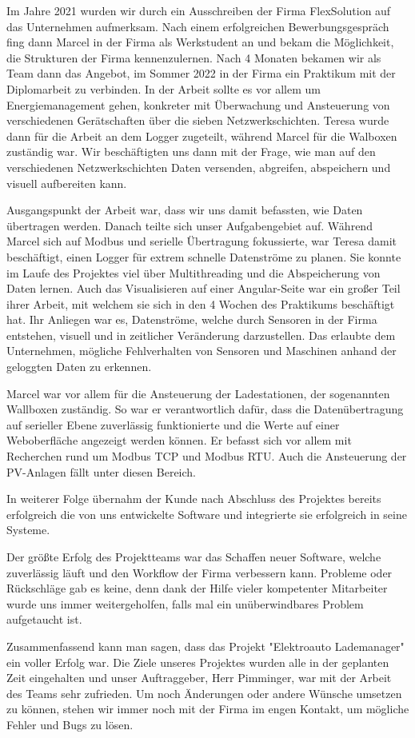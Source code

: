 
Im Jahre 2021 wurden wir durch ein Ausschreiben der Firma FlexSolution auf das Unternehmen aufmerksam. Nach einem erfolgreichen Bewerbungsgespräch fing dann Marcel in der Firma als Werkstudent an und bekam die Möglichkeit, die Strukturen der Firma kennenzulernen. Nach 4 Monaten bekamen wir als Team dann das Angebot, im Sommer 2022 in der Firma ein Praktikum mit der Diplomarbeit zu verbinden. In der Arbeit sollte es vor allem um Energiemanagement gehen, konkreter mit Überwachung und Ansteuerung von verschiedenen Gerätschaften über die sieben Netzwerkschichten. Teresa wurde dann für die Arbeit an dem Logger zugeteilt, während Marcel für die Walboxen zuständig war. Wir beschäftigten uns dann mit der Frage, wie man auf den verschiedenen Netzwerkschichten Daten versenden, abgreifen, abspeichern und visuell aufbereiten kann.



Ausgangspunkt der Arbeit war, dass wir uns damit befassten, wie Daten übertragen werden. Danach teilte sich unser Aufgabengebiet auf. Während Marcel sich auf Modbus und serielle Übertragung fokussierte, war Teresa damit beschäftigt, einen Logger für extrem schnelle Datenströme zu planen. Sie konnte im Laufe des Projektes viel über Multithreading und die Abspeicherung von Daten lernen. Auch das Visualisieren auf einer Angular-Seite war ein großer Teil ihrer Arbeit, mit welchem sie sich in den 4 Wochen des Praktikums beschäftigt hat. Ihr Anliegen war es, Datenströme, welche durch Sensoren in der Firma entstehen, visuell und in zeitlicher Veränderung darzustellen. Das erlaubte dem Unternehmen, mögliche Fehlverhalten von Sensoren und Maschinen anhand der geloggten Daten zu erkennen.



Marcel war vor allem für die Ansteuerung der Ladestationen, der sogenannten Wallboxen zuständig. So war er verantwortlich dafür, dass die Datenübertragung auf serieller Ebene zuverlässig funktionierte und die Werte auf einer Weboberfläche angezeigt werden können. Er befasst sich vor allem mit Recherchen rund um Modbus TCP und Modbus RTU. Auch die Ansteuerung der PV-Anlagen fällt unter diesen Bereich.


In weiterer Folge übernahm der Kunde nach Abschluss des Projektes bereits erfolgreich die von uns entwickelte Software und integrierte sie erfolgreich in seine Systeme.


Der größte Erfolg des Projektteams war das Schaffen neuer Software, welche zuverlässig läuft und den Workflow der Firma verbessern kann. Probleme oder Rückschläge gab es keine, denn dank der Hilfe vieler kompetenter Mitarbeiter wurde uns immer weitergeholfen, falls mal ein unüberwindbares Problem aufgetaucht ist.


Zusammenfassend kann man sagen, dass das Projekt "Elektroauto Lademanager" ein voller Erfolg war. Die Ziele unseres Projektes wurden alle in der geplanten Zeit eingehalten und unser Auftraggeber, Herr Pimminger, war mit der Arbeit des Teams sehr zufrieden. Um noch Änderungen oder andere Wünsche umsetzen zu können, stehen wir immer noch mit der Firma im engen Kontakt, um mögliche Fehler und Bugs zu lösen.